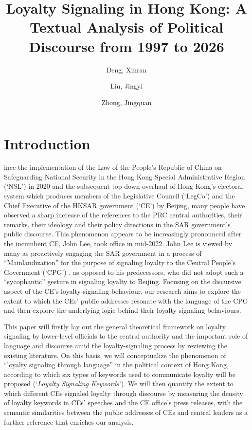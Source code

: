 \documentclass[9pt,a4paper,twocolumn,twoside]{rho-class/rho}
\title{Loyalty Signaling in Hong Kong: A Textual Analysis of Political Discourse from 1997 to 2026}
\author[{\textasteriskcentered},a, 1]{Deng, Xinran}
\author[{\textdagger},b,2]{Liu, Jingyi}
\author[{\textdagger},c,3]{Zhong, Jingquan}
\affil[a]{The University of Hong Kong}
\affil[b]{The University of Hong Kong}
\affil[c]{The University of Hong Kong}
\begin{document}
    \maketitle
    \thispagestyle{firststyle}


\section{Introduction}

    ince the implementation of the Law of the People's Republic of China on Safeguarding National Security in the Hong Kong Special Administrative Region (`NSL') 
    in 2020 and the subsequent top-down overhaul of Hong Kong's electoral system which produces members of the Legislative Council (`LegCo') and the Chief Executive of the HKSAR 
    government (`CE') by Beijing, many people have observed a sharp increase of the references to the PRC central authorities, their remarks, their ideology and their policy directions
     in the SAR government's public discourse. This phenomenon appears to be increasingly pronounced after the incumbent CE, John Lee, took office in mid-2022. John Lee is viewed 
     by many as proactively engaging the SAR government in a process of ``Mainlandization'' for the purpose of signaling loyalty to the Central People's Government (`CPG') \parencite{chan2023ccp}, 
     as opposed to his predecessors, who did not adopt such a ``sycophantic'' gesture in signaling loyalty to Beijing. Focusing on the discursive aspect of the CE's 
    loyalty-signaling behaviour, our research aims to explore the extent to which the CEs' public addresses resonate with the language of the CPG and then explore the underlying 
    logic behind their loyalty-signaling behaviours.

    This paper will firstly lay out the general theoretical framework on loyalty signaling by lower-level officials to the central authority and the important role of language 
    and discourse amid the loyalty-signaling process by reviewing the existing literature. On this basis, we will conceptualize the phenomenon of ``loyalty signaling through 
    language'' in the political context of Hong Kong, according to which six types of keywords used to communicate loyalty will be proposed (`\textit{Loyalty Signaling Keywords}'). 
    We will then quantify the extent to which different CEs signaled loyalty through discourse by measuring the density of loyalty keywords in CEs' speeches and the CE office's 
    press releases, with the semantic similarities between the public addresses of CEs and central leaders as a further reference that enriches our analysis.
	
\end{document}
